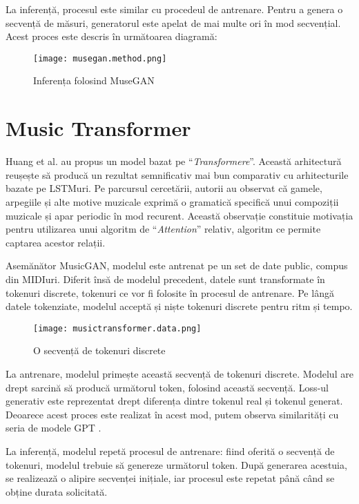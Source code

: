 La inferență, procesul este similar cu procedeul de antrenare. Pentru a genera o secvență de măsuri, generatorul este apelat de mai multe ori în mod secvențial. Acest proces este descris în următoarea diagramă:

\begin{figure}[H]
    \centering
    \texttt{[image: musegan.method.png]}
    \caption{Inferența folosind MuseGAN}
    \label{musegan-method}
\end{figure}

\section{Music Transformer}

Huang et al. \cite{huang2018musictransformer} au propus un model bazat pe ``\textit{Transformere}''. Această arhitectură reușește să producă un rezultat semnificativ mai bun comparativ cu arhitecturile bazate pe LSTMuri. Pe parcursul cercetării, autorii au observat că gamele, arpegiile și alte motive muzicale exprimă o gramatică specifică unui compoziții muzicale și apar periodic în mod recurent. Această observație constituie motivația pentru utilizarea unui algoritm de ``\textit{Attention}'' relativ, algoritm ce permite captarea acestor relații.

Asemănător MusicGAN, modelul este antrenat pe un set de date public, compus din MIDIuri. Diferit însă de modelul precedent, datele sunt transformate în tokenuri discrete, tokenuri ce vor fi folosite în procesul de antrenare. Pe lângă datele tokenziate, modelul acceptă și niște tokenuri discrete pentru ritm și tempo.

\begin{figure}[H]
    \centering
    \texttt{[image: musictransformer.data.png]}
    \caption{O secvență de tokenuri discrete}
    \label{music-transformer-data}
\end{figure}

La antrenare, modelul primește această secvență de tokenuri discrete. Modelul are drept sarcină să producă următorul token, folosind această secvență. Loss-ul generativ este reprezentat drept diferența dintre tokenul real și tokenul generat. Deoarece acest proces este realizat în acest mod, putem observa similarități cu seria de modele GPT \cite{radford2018improving}.

La inferență, modelul repetă procesul de antrenare: fiind oferită o secvență de tokenuri, modelul trebuie să genereze următorul token. După generarea acestuia, se realizează o alipire secvenței inițiale, iar procesul este repetat până când se obține durata solicitată.

